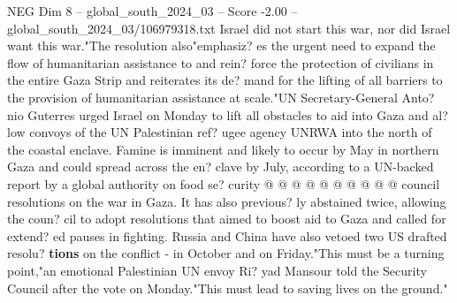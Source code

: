 \begin{textsample}{NEG Dim 8 – global\_south\_2024\_03 – Score -2.00 – global\_south\_2024\_03/106979318.txt}
Israel did not start this war, nor did Israel want this war."The resolution also"emphasiz? es the urgent need to expand the flow of humanitarian assistance to and rein? force the protection of civilians in the entire Gaza Strip and reiterates its de? mand for the lifting of all barriers to the provision of humanitarian assistance at scale."UN Secretary-General Anto? nio Guterres urged Israel on Monday to lift all obstacles to aid into Gaza and al? low convoys of the UN Palestinian ref? ugee agency UNRWA into the north of the coastal enclave.
Famine is imminent and likely to occur by May in northern Gaza and could spread across the en? clave by July, according to a UN-backed report by a global authority on food se? curity @ @ @ @ @ @ @ @ @ @ council resolutions on the war in Gaza.
It has also previous? ly abstained twice, allowing the coun? cil to adopt resolutions that aimed to boost aid to Gaza and called for extend? ed pauses in fighting.
Russia and China have also vetoed two US drafted resolu? \textbf{tions} on the conflict - in October and on Friday."This must be a turning point,"an emotional Palestinian UN envoy Ri? yad Mansour told the Security Council after the vote on Monday."This must lead to saving lives on the ground."

\end{textsample}
